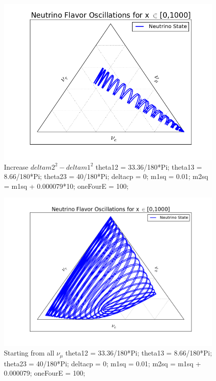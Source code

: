 \documentclass{tufte-handout}
\begin{document}
\begin{figure}
\centering
\includegraphics{assets/ternary/1000-3}
\caption{ Increase $deltam2^2-deltam1^2$\newline
theta12 = 33.36/180*Pi;\newline
theta13 = 8.66/180*Pi;\newline
theta23 = 40/180*Pi;\newline
deltacp = 0;\newline
m1sq = 0.01;\newline
m2sq = m1sq + 0.000079*10;\newline
oneFourE = 100; 
}
\end{figure}




\begin{figure}
\centering
\includegraphics{assets/ternary/1000-mu-1}
\caption{ Starting from all $\nu_\mu$ \newline
theta12 = 33.36/180*Pi;\newline
theta13 = 8.66/180*Pi;\newline
theta23 = 40/180*Pi;\newline
deltacp = 0;\newline
m1sq = 0.01;\newline
m2sq = m1sq + 0.000079;\newline
oneFourE = 100; 
}
\end{figure}






\end{document}
